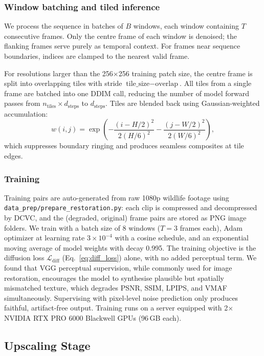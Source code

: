 \documentclass[10pt, conference]{IEEEtran}
\begin{document}
\subsubsection{Window batching and tiled inference}
\label{sssec:tiling}

We process the sequence in batches of $B$ windows, each window containing $T$ consecutive frames. Only the centre frame of each window is denoised; the flanking frames serve purely as temporal context. For frames near sequence boundaries, indices are clamped to the nearest valid frame.

For resolutions larger than the 256$\times$256 training patch size, the centre frame is split into overlapping tiles with stride $\text{tile\_size} - \text{overlap}$. All tiles from a single frame are batched into one DDIM call, reducing the number of model forward passes from $n_\text{tiles} \times d_\text{steps}$ to $d_\text{steps}$. Tiles are blended back using Gaussian-weighted accumulation:
\begin{equation}
w(i, j) = \exp\!\left(-\frac{(i - H/2)^2}{2(H/6)^2} - \frac{(j - W/2)^2}{2(W/6)^2}\right),
\end{equation}
which suppresses boundary ringing and produces seamless composites at tile edges.

\subsubsection{Training}

Training pairs are auto-generated from raw 1080p wildlife footage using \texttt{data\_prep/prepare\_restoration.py}: each clip is compressed and decompressed by DCVC, and the (degraded, original) frame pairs are stored as PNG image folders. We train with a batch size of 8 windows ($T{=}3$ frames each), Adam optimizer at learning rate $3 \times 10^{-4}$ with a cosine schedule, and an exponential moving average of model weights with decay 0.995. The training objective is the diffusion loss $\mathcal{L}_{\text{diff}}$ (Eq.~\ref{eq:diff_loss}) alone, with no added perceptual term. We found that VGG perceptual supervision, while commonly used for image restoration, encourages the model to synthesise plausible but spatially mismatched texture, which degrades PSNR, SSIM, LPIPS, and VMAF simultaneously. Supervising with pixel-level noise prediction only produces faithful, artifact-free output. Training runs on a server equipped with 2$\times$ NVIDIA RTX PRO 6000 Blackwell GPUs (96\,GB each).

\subsection{Upscaling Stage}
\label{ssec:upscaling}
\end{document}
